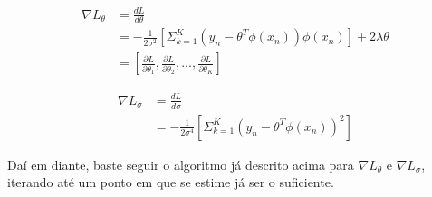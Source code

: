 \documentclass{article}
\begin{document}
\begin{align}
    \nabla L_{\theta} &= \frac{dL}{d\theta} \\
    &= -\frac{1}{2\sigma^{2}}[\Sigma_{k=1}^{K}
    (y_{n} - \theta^{T}\phi(x_{n}))\phi(x_{n})]
    + 2\lambda \theta \\
    &= [\frac{\partial L}{\partial \theta_{1}}, 
    \frac{\partial L}{\partial \theta_{2}}, ...,
    \frac{\partial L}{\partial \theta_{K}}]
\end{align}

\begin{align}
    \nabla L_{\sigma} &= \frac{dL}{d\sigma} \\
    &= -\frac{1}{2\sigma^{4}}[\Sigma_{k=1}^{K}
    (y_{n} - \theta^{T}\phi(x_{n}))^{2}]
\end{align}

Daí em diante, baste seguir o algoritmo já descrito acima
para $\nabla L_{\theta}$ e $\nabla L_{\sigma}$, iterando até 
um ponto em que se estime já ser o suficiente.
\end{document}
